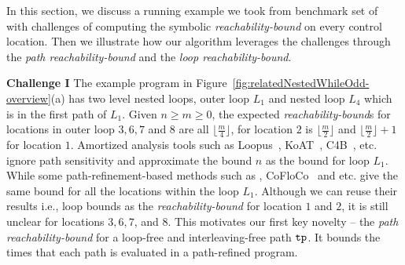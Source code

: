 In this section, we discuss a running example we took from
benchmark set of~\cite{GulwaniJK10} with
challenges of computing the symbolic
\emph{reachability-bound} on
every control location. Then we illustrate how our algorithm leverages the challenges through the \emph{path reachability-bound} and the \emph{loop reachability-bound}.



\textbf{Challenge I}
The example program in Figure~\ref{fig:relatedNestedWhileOdd-overview}(a) has two level nested loops, outer loop $L_1$ and nested loop $L_4$ which is in the first path of $L_1$. Given $n \geq m \geq 0$,
the expected \emph{reachability-bound}s for locations in outer loop $3, 6, 7$ and $8$ are all $\lfloor\frac{m}{4}\rfloor$,
for location $2$ is $\lfloor\frac{m}{2}\rfloor$ and $\lfloor\frac{m}{2}\rfloor + 1$ for location $1$.
Amortized analysis tools such as Loopus~\cite{SinnZV17}, KoAT~\cite{BrockschmidtEFFG14,FalkeKS12,FalkeKS11}, C4B~\cite{CarbonneauxHS15}, etc. ignore path sensitivity and approximate the bound $n$ as the bound for loop $L_1$. 
While some path-refinement-based methods such as \cite{GulwaniZ10,GulwaniJK09}, CoFloCo~\cite{Montoya17,Flores-Montoya16,Flores-MontoyaH14} and etc. give the same bound for all the locations within the loop $L_1$. 
Although we can reuse their results i.e., loop bounds as the \emph{reachability-bound} for location $1$ and $2$,
it is still unclear for locations $3, 6, 7$, and $8$.
%
This motivates our first key novelty -- the \emph{path reachability-bound}
for a loop-free and interleaving-free path $\mathtt{tp}$.
It bounds the times that each path is evaluated in a path-refined program.

